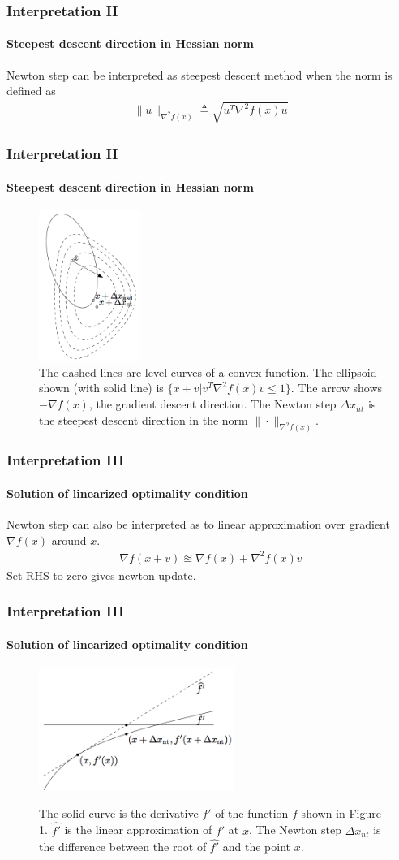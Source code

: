 \documentclass{beamer}
\newcommand{\be}{\begin{eqnarray}}
\newcommand{\ee}{\end{eqnarray}}
\begin{document}
\begin{frame}
\frametitle{Interpretation II}
\framesubtitle{Steepest descent direction in Hessian norm}
    Newton step can be interpreted as 
    steepest descent method when the norm is defined as
    \be
    \| u \|_{\nabla^2 f(x)} \triangleq \sqrt{u^T \nabla^2 f(x) u}
    \ee
\end{frame}
\begin{frame}
\frametitle{Interpretation II}
\framesubtitle{Steepest descent direction in Hessian norm}
\begin{figure}
\includegraphics[width=1.3in]{figure/steepest.png}
\caption{
The dashed lines are level curves of a convex function. The ellipsoid shown
(with solid line) is $\{x + v | v^T \nabla^2 f(x) v \leq 1\}$. The arrow shows
$-\nabla f(x)$, the gradient descent direction. The Newton step $\Delta x_{nt}$ is the
steepest descent direction in the norm $\|\cdot \|_{\nabla^2 f(x)}$.
}
\label{fig:2}
\end{figure}
\end{frame}
\begin{frame}
\frametitle{Interpretation III}
\framesubtitle{Solution of linearized optimality condition}
    Newton step can also be interpreted as 
    to linear approximation over gradient $\nabla f(x)$ around $x$.
    \be
        \nabla f(x+v) \approxeq \nabla f(x) + \nabla^2 f(x) v
    \ee
    Set RHS to zero gives newton update.
\end{frame}
\begin{frame}
\frametitle{Interpretation III}
\framesubtitle{Solution of linearized optimality condition}
\begin{figure}
\includegraphics[width=2.5in]{figure/linear.png}
\label{fig:3}
\caption{
The solid curve is the derivative $f'$ of the function $f$ shown in Figure
\ref{fig:2}.
$\hat{f'}$ is the linear approximation of $f'$ at $x$. The Newton step
$\Delta x_{nt}$ is the difference between the root of $\hat{f'}$ and the point $x$.
}
\end{figure}
\end{frame}
\end{document}
